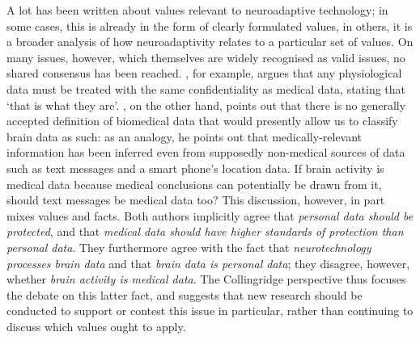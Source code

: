 A lot has been written about values relevant to neuroadaptive technology; in some cases, this is already in the form of clearly formulated values, in others, it is a broader analysis of how neuroadaptivity relates to a particular set of values. On many issues, however, which themselves are widely recognised as valid issues, no shared consensus has been reached. , for example, argues that any physiological data must be treated with the same confidentiality as medical data, stating that `that is what they are'. , on the other hand, points out that there is no generally accepted definition of biomedical data that would presently allow us to classify brain data as such: as an analogy, he points out that medically-relevant information has been inferred even from supposedly non-medical sources of data such as text messages and a smart phone's location data. If brain activity is medical data because medical conclusions can potentially be drawn from it, should text messages be medical data too? This discussion, however, in part mixes values and facts. Both authors implicitly agree that \emph{personal data should be protected}, and that \emph{medical data should have higher standards of protection than personal data}. They furthermore agree with the fact that \emph{neurotechnology processes brain data} and that \emph{brain data is personal data}; they disagree, however, whether \emph{brain activity is medical data}. The Collingridge perspective thus focuses the debate on this latter fact, and suggests that new research should be conducted to support or contest this issue in particular, rather than continuing to discuss which values ought to apply.

